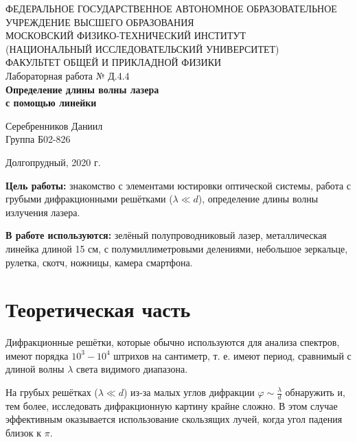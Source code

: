 \documentclass[a4paper,12pt]{article} %
\begin{document}
\begin{center}
	\footnotesize{ФЕДЕРАЛЬНОЕ ГОСУДАРСТВЕННОЕ АВТОНОМНОЕ ОБРАЗОВАТЕЛЬНОЕ 			УЧРЕЖДЕНИЕ ВЫСШЕГО ОБРАЗОВАНИЯ}\\
	\footnotesize{МОСКОВСКИЙ ФИЗИКО-ТЕХНИЧЕСКИЙ ИНСТИТУТ\\(НАЦИОНАЛЬНЫЙ 			ИССЛЕДОВАТЕЛЬСКИЙ УНИВЕРСИТЕТ)}\\
	\footnotesize{ФАКУЛЬТЕТ ОБЩЕЙ И ПРИКЛАДНОЙ ФИЗИКИ\\}
	\hfill \break
	\hfill\break
	\hfill\break
	\hfill \break
	\hfill \break
	\hfill \break
	\hfill \break
	\hfill \break
	\hfill \break
	\hfill \break
	\hfill \break
	\hfill \break
	\hfill \break
	\hfill \break
	\large{Лабораторная работа № Д.4.4 \\\textbf{Определение длины волны лазера\\с помощью линейки}}\\
	\hfill \break
	\hfill \break
	\hfill \break
	\begin{flushright}
		Серебренников Даниил\\
		Группа Б02-826
	\end{flushright}
	\hfill \break
	\hfill \break
	\hfill \break
	\hfill \break
	\hfill \break
	\hfill \break
	\hfill \break
	\hfill \break
	\hfill \break
	\hfill \break
	\hfill \break
\end{center}
\begin{center}
	Долгопрудный, 2020 г.
\end{center}
\thispagestyle{empty}
\newpage
	\textbf{Цель работы:} знакомство с элементами юстировки оптической системы, работа с грубыми дифракционными решётками ($\lambda \ll d $), определение длины волны излучения лазера.

	\textbf{В работе используются:}  зелёный полупроводниковый лазер, металлическая линейка длиной 15 см, с полумиллиметровыми делениями, небольшое зеркальце, рулетка, скотч, ножницы, камера смартфона.
\section{Теоретическая часть}
	Дифракционные решётки, которые обычно используются для анализа спектров, имеют порядка $10^{3} - 10^{4}$ штрихов на сантиметр, т. е. имеют период, сравнимый с длиной волны $\lambda$ света видимого диапазона. 

	На грубых решётках ($\lambda \ll d $) из-за малых углов дифракции $\varphi \sim \frac{\lambda}{d}$ обнаружить  и, тем более, исследовать дифракционную картину крайне сложно. В этом случае эффективным оказывается использование скользящих лучей, когда угол падения близок к $\pi$.
\end{document}

